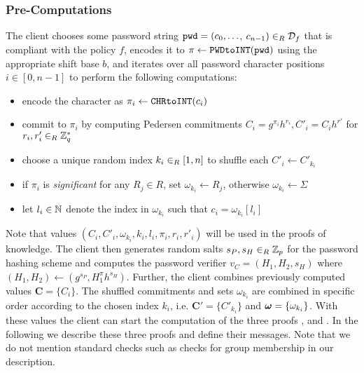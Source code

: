 \subsubsection{Pre-Computations}
The client chooses some password string $\mathtt{pwd}=(c_0,\ldots$, $c_{n-1})\in_R\mathcal{D}_f$ that is compliant with the policy $f$, encodes it to $\pi\gets\texttt{PWDtoINT}(\mathtt{pwd})$ using the appropriate shift base $b$, and iterates over all password character positions $i\in[0,n-1]$ to perform the following computations:
\begin{itemize}
  \item encode the character as $\pi_i\gets\texttt{CHRtoINT}(c_i)$
  \item commit to $\pi_i$ by computing Pedersen commitments $C_i=g^{\pi_i}h^{r_i}, C'_i=C_i h^{r'}$ for $r_i,r'_i\in_R\mathbb{Z}^\ast_q$
  \item choose a unique random index $k_{i} \in_R[1,n]$ to shuffle each $C'_i\gets C'_{k_i}$
  \item if $\pi_i$ is \emph{significant} for any $R_j\in R$, set $\omega_{k_i}\gets R_j$, otherwise $\omega_{k_i}\gets\Sigma$
  \item let $l_i\in\mathbb{N}$ denote the index in $\omega_{k_i}$ such that $c_i=\omega_{k_i}[l_i]$
\end{itemize}
Note that values $(C_i, C'_i, \omega_{k_i}, k_{i}, l_i, \pi_i, r_i, r'_i)$ will be used in the proofs of knowledge.
The client then generates random salts $s_P,s_H\in_R\mathbb{Z}_p$ for the password hashing scheme and computes the password verifier $v_C=(H_1, H_2, s_H)$ where $(H_1,H_2)\gets (g^{s_P}, H_1^\pi h^{s_H})$.
Further, the client combines previously computed values $\bm C = \{C_{i}\}$.
The shuffled commitments and sets $\omega_{k_i}$ are combined in specific order according to the chosen index $k_i$, i.e. $\bm C' = \{C'_{k_{i}}\}$ and $\boldsymbol{\mathbf{\omega}} = \{\omega_{k_i}\}$.
With these values the client can start the computation of the three proofs \PoM, \PoE and \PoS.
In the following we describe these three proofs and define their messages. Note that we do not mention standard checks such as checks for group membership in our description.

